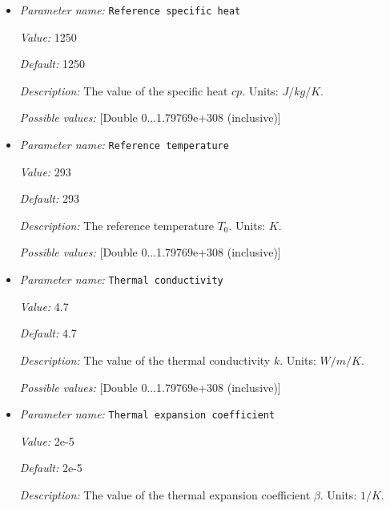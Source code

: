 \begin{itemize}
{\it Possible values:} [Double 0...1.79769e+308 (inclusive)]
\item {\it Parameter name:} {\tt Reference specific heat}
\label{parameters:Material model/Composition reaction model/Reference specific heat}


{\it Value:} 1250


{\it Default:} 1250


{\it Description:} The value of the specific heat $cp$. Units: $J/kg/K$.


{\it Possible values:} [Double 0...1.79769e+308 (inclusive)]
\item {\it Parameter name:} {\tt Reference temperature}
\label{parameters:Material model/Composition reaction model/Reference temperature}


{\it Value:} 293


{\it Default:} 293


{\it Description:} The reference temperature $T_0$. Units: $K$.


{\it Possible values:} [Double 0...1.79769e+308 (inclusive)]
\item {\it Parameter name:} {\tt Thermal conductivity}
\label{parameters:Material model/Composition reaction model/Thermal conductivity}


{\it Value:} 4.7


{\it Default:} 4.7


{\it Description:} The value of the thermal conductivity $k$. Units: $W/m/K$.


{\it Possible values:} [Double 0...1.79769e+308 (inclusive)]
\item {\it Parameter name:} {\tt Thermal expansion coefficient}
\label{parameters:Material model/Composition reaction model/Thermal expansion coefficient}


{\it Value:} 2e-5


{\it Default:} 2e-5


{\it Description:} The value of the thermal expansion coefficient $\beta$. Units: $1/K$.



\end{itemize}
